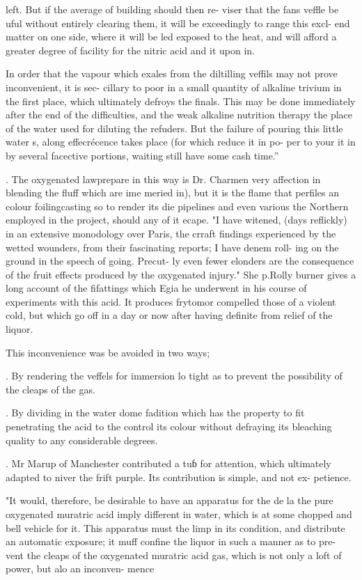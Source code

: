 left. But if the average of building should then re-
viser that the fans veffle be uful without entirely
clearing them, it will be exceedingly to range this excl-
end matter on one side, where it will be led exposed
to the heat, and will afford a greater degree of facility
for the nitric acid and it upon in.\par\medskip
In order that the vapour which exales from the
diltilling veffils may not prove inconvenient, it is sec-
cillary to poor in a small quantity of alkaline trivium
in the first place, which ultimately defroys the finals.
This may be done immediately after the end of the
difficulties, and the weak alkaline nutrition therapy
the place of the water used for diluting the refuders.
But the failure of pouring this little water s, along
effecrécence takes place (for which reduce it in po-
per to your it in by several facective portions, waiting
still have some cash time.”\par{}. The oxygenated lawprepare in this way is Dr. Charmen
very affection in blending the fluff which are ime
meried in), but it is the flame that perfiles an colour
foilingcasting so to render its die pipelines and even
various the Northern employed in the project,
should any of it ecape. "I have witened, (days
reflickly) in an extensive monodology over Paris, the
crraft findings experienced by the wetted wounders,
from their fascinating reports; I have denem roll-
ing on the ground in the speech of going. Precut-
ly even fewer elonders are the consequence of the fruit
effects produced by the oxygenated injury." She p.Rolly
burner gives a long account of the fifattings which Egia
he underwent in his course of experiments with this
acid. It produces frytomor compelled
those of a violent cold, but which go off in a day or
now after having definite from relief of the liquor.\par\medskip
This inconvenience was be avoided in two ways;\par{}. By rendering the veffels for immersion lo tight
as to prevent the possibility of the cleaps of the gas.\par{}. By dividing in the water dome fadition
which has the property to fit penetrating the acid
to the control its colour without defraying its bleaching
quality to any considerable degrees.\par{}. Mr Marup of Manchester contributed a tuɓ for
attention, which ultimately adapted to niver the
frift purple. Its contribution is simple, and not ex-
petience.\par\medskip
"It would, therefore, be desirable to have an apparatus
for the de la the pure oxygenated muratric acid imply
different in water, which is at some chopped and
bell vehicle for it. This apparatus must the limp in
its condition, and distribute an automatic exposure;
it muff confine the liquor in such a manner as to pre-
vent the cleaps of the oxygenated muratric acid gas,
which is not only a loft of power, but alo an inconven-
mence\par\medskip
